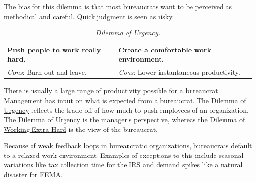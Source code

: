 The bias for this dilemma is that most bureaucrats want to be perceived as methodical and careful. Quick judgment is seen as risky. 


\begin{center}
\begin{table}[H] %
\begin{tabular}{ | m{\dilemmatablewidth}| m{\dilemmatablewidth} | } 
  \hline
  \textbf{Push people to work really hard.} & 
  \textbf{Create a comfortable work environment.} \\ 
  \hline
  \textit{Cons}: Burn out and leave. & 
  \textit{Cons}: Lower instantaneous productivity. \\  
  \hline
\end{tabular}
\caption{
\textit{Dilemma of Urgency.}
}
\label{table:dilemma-personal-manager-rate-of-work}
\end{table}
\end{center}

There is usually a large range of productivity possible for a bureaucrat. Management has input on what is expected from 
 a bureaucrat. The 
\hyperref[table:dilemma-personal-manager-rate-of-work]{Dilemma of Urgency} reflects the trade-off of how much to push employees of an organization. The \hyperref[table:dilemma-personal-manager-rate-of-work]{Dilemma of Urgency} is the manager's perspective, whereas the
\hyperref[table:dilemma-personal-work-extra-or-work-as-expected]{Dilemma of Working Extra Hard}
is the view of the bureaucrat. 


Because of weak feedback loops in bureaucratic organizations, bureaucrats default to a relaxed work environment. Examples of exceptions to this include seasonal variations like tax collection time for the \href{https://en.wikipedia.org/wiki/Internal_Revenue_Service}{IRS} 
%
%
and demand spikes like a natural disaster for \href{https://en.wikipedia.org/wiki/Federal_Emergency_Management_Agency}{FEMA}. 

